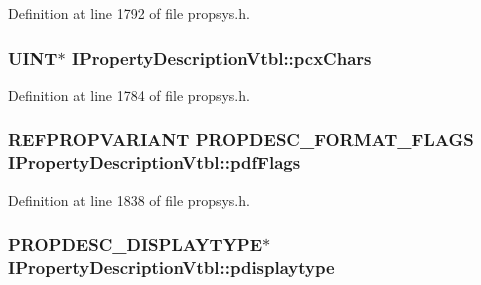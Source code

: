 Definition at line 1792 of file propsys.\+h.

\subsubsection[{\texorpdfstring{pcx\+Chars}{pcxChars}}]{ {\bf U\+I\+NT}$\ast$ I\+Property\+Description\+Vtbl\+::pcx\+Chars}\hypertarget{struct_i_property_description_vtbl_abd477191916cd11656dc8af92a85d513}{}\label{struct_i_property_description_vtbl_abd477191916cd11656dc8af92a85d513}


Definition at line 1784 of file propsys.\+h.

\subsubsection[{\texorpdfstring{pdf\+Flags}{pdfFlags}}]{ {\bf R\+E\+F\+P\+R\+O\+P\+V\+A\+R\+I\+A\+NT} {\bf P\+R\+O\+P\+D\+E\+S\+C\+\_\+\+F\+O\+R\+M\+A\+T\+\_\+\+F\+L\+A\+GS} I\+Property\+Description\+Vtbl\+::pdf\+Flags}\hypertarget{struct_i_property_description_vtbl_aea3d749bc265ec894bd7d89e7a8f3cd1}{}\label{struct_i_property_description_vtbl_aea3d749bc265ec894bd7d89e7a8f3cd1}


Definition at line 1838 of file propsys.\+h.

\subsubsection[{\texorpdfstring{pdisplaytype}{pdisplaytype}}]{ {\bf P\+R\+O\+P\+D\+E\+S\+C\+\_\+\+D\+I\+S\+P\+L\+A\+Y\+T\+Y\+PE}$\ast$ I\+Property\+Description\+Vtbl\+::pdisplaytype}\hypertarget{struct_i_property_description_vtbl_aefd2d3352e69ee4bad425eb9c1302fc6}{}\label{struct_i_property_description_vtbl_aefd2d3352e69ee4bad425eb9c1302fc6}


